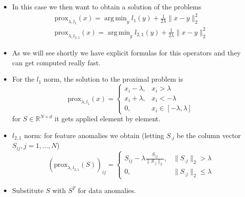 \documentclass{beamer}
\theoremstyle{plain}
\theoremstyle{definition}
\theoremstyle{remark}
\newcommand{\R}{\mathbb{R}}
\newcommand{\norm}[1]{\lVert#1\rVert}
\newcommand{\prox}{\text{prox}}
\DeclareMathOperator*{\argmin}{arg\,min}
\begin{document}
\begin{frame}
	\begin{itemize}
		\item In this case we then want to obtain a solution of the problems
			\begin{align}
				\prox_{\lambda, l_1}(x) = \argmin_{y}{l_1(y)+\frac{1}{2\lambda}\norm{x-y}_{2}^{2}}\\
				\prox_{\lambda, l_{2,1}}(x) = \argmin_{y}{l_{2,1}(y)+\frac{1}{2\lambda}\norm{x-y}_{2}^{2}}
			\end{align} 
        \item As we will see shortly we have explicit formulas for this operators and they can get computed really fast.
	\end{itemize}
\end{frame}

\begin{frame}
	\begin{itemize}
		\item For the $l_1$ norm, the solution to the proximal problem is
			\begin{equation}
				\prox_{\lambda, l_1}(x) = \begin{cases}
					x_i - \lambda, & x_i>\lambda\\
					x_i + \lambda, & x_i<-\lambda\\
					0, & x_i\in[-\lambda, \lambda]
				\end{cases}
			\end{equation}
			for $S\in\R^{N\times d}$  it gets applied element by element.
		\item $l_{2,1}$ norm: for feature anomalies we obtain (letting $S_{\cdot j}$ be the column vector $S_{ij}, j=1, \ldots, N$)
			\begin{equation}
				(\prox_{\lambda, l_{2,1}}(S))_{ij} = \begin{cases}
					S_{ij}- \lambda\frac{S_{ij}}{\norm{S_{\cdot j}}_{2}}, & \norm{S_{\cdot j}}_{2} > \lambda\\
					0, & \norm{S_{\cdot j}}_{2} \leq \lambda
				\end{cases}
			\end{equation}
		\item Substitute $S$ with $S^T$ for data anomalies.
	\end{itemize}
\end{frame}
\end{document}
